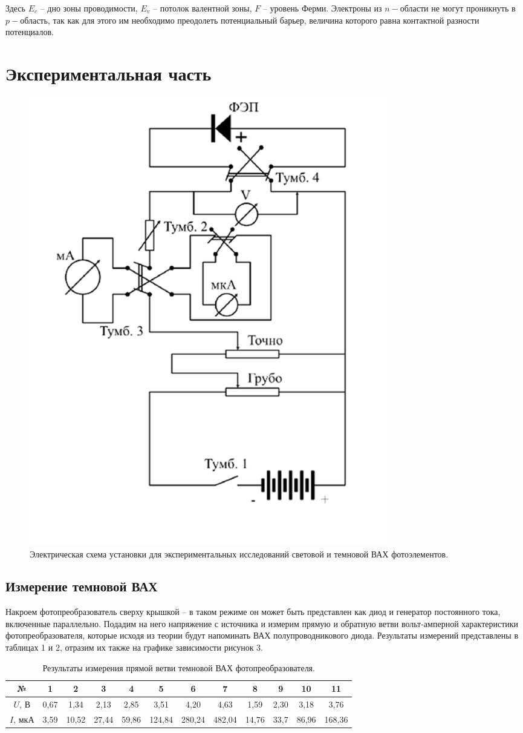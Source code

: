 \documentclass[a4paper, 12pt]{article}
\begin{document}
Здесь $E_c$ – дно зоны проводимости, $E_v$ – потолок валентной зоны, $F$ – уровень Ферми. Электроны из $n-$области не могут проникнуть в $p-$область, так как для этого им необходимо преодолеть потенциальный барьер, величина которого равна контактной разности потенциалов.  



\section{Экспериментальная часть}
\begin{figure}[!h]
    \centering
    \includegraphics[width=0.5\linewidth]{img/scheme.png}
    \caption{Электрическая схема установки для экспериментальных исследований световой и темновой ВАХ фотоэлементов.}
\end{figure}

\subsection{Измерение темновой ВАХ}
Накроем фотопреобразователь сверху крышкой -- в таком режиме он может быть представлен как диод и генератор постоянного тока, включенные параллельно. Подадим на него напряжение с источника и измерим прямую и обратную ветви вольт-амперной характеристики фотопреобразователя, которые исходя из теории будут напоминать ВАХ полупроводникового диода. Результаты измерений представлены в таблицах 1 и 2, отразим их также на графике зависимости рисунок 3.

    \begin{table}[h!]
    \centering
    \begin{tabular}{|c|c|c|c|c|c|c|c|c|c|c|c|}
    \hline
        № & 1 & 2 & 3 & 4 & 5 & 6 & 7 & 8 & 9& 10 & 11 \\ \hline
        $U$, В & 0,67 & 1,34 & 2,13 & 2,85& 3,51 & 4,20 & 4,63 & 1,59 & 2,30 & 3,18 & 3,76 \\ \hline
        $I$, мкА & 3,59 & 10,52 & 27,44 & 59,86 & 124,84 & 280,24 & 482,04 & 14,76 & 33,7 & 86,96 & 168,36 \\ \hline
    \end{tabular}
    \caption{Результаты измерения прямой ветви темновой ВАХ фотопреобразователя.}
    \label{table_dark_forward_VAC}
    \end{table}
\end{document}

